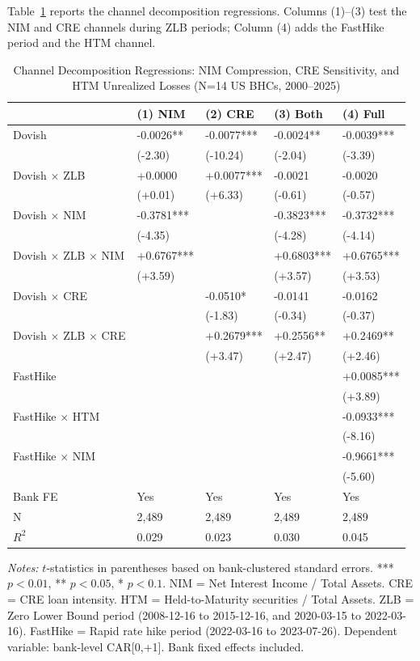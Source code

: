 \documentclass[12pt,a4paper]{article}
\begin{document}
Table~\ref{tab:channel} reports the channel decomposition regressions. Columns (1)--(3) test the NIM and CRE channels during ZLB periods; Column (4) adds the FastHike period and the HTM channel.

\begin{table}[H]
\centering
\caption{Channel Decomposition Regressions: NIM Compression, CRE Sensitivity, and HTM Unrealized Losses (N=14 US BHCs, 2000--2025)}
\label{tab:channel}
\small
\begin{tabular}{lllll}
\toprule
 & (1) NIM & (2) CRE & (3) Both & (4) Full \\
\midrule
Dovish & -0.0026** & -0.0077*** & -0.0024** & -0.0039*** \\
 & (-2.30) & (-10.24) & (-2.04) & (-3.39) \\
Dovish $\times$  ZLB & +0.0000 & +0.0077*** & -0.0021 & -0.0020 \\
 & (+0.01) & (+6.33) & (-0.61) & (-0.57) \\
Dovish $\times$  NIM & -0.3781*** &  & -0.3823*** & -0.3732*** \\
 & (-4.35) &  & (-4.28) & (-4.14) \\
Dovish $\times$  ZLB $\times$  NIM & +0.6767*** &  & +0.6803*** & +0.6765*** \\
 & (+3.59) &  & (+3.57) & (+3.53) \\
Dovish $\times$  CRE &  & -0.0510* & -0.0141 & -0.0162 \\
 &  & (-1.83) & (-0.34) & (-0.37) \\
Dovish $\times$  ZLB $\times$  CRE &  & +0.2679*** & +0.2556** & +0.2469** \\
 &  & (+3.47) & (+2.47) & (+2.46) \\
FastHike &  &  &  & +0.0085*** \\
 &  &  &  & (+3.89) \\
FastHike $\times$  HTM &  &  &  & -0.0933*** \\
 &  &  &  & (-8.16) \\
FastHike $\times$  NIM &  &  &  & -0.9661*** \\
 &  &  &  & (-5.60) \\
Bank FE & Yes & Yes & Yes & Yes \\
N & 2,489 & 2,489 & 2,489 & 2,489 \\
$R^2$ & 0.029 & 0.023 & 0.030 & 0.045 \\
\bottomrule
\end{tabular}
\end{table}
\noindent\textit{Notes:} $t$-statistics in parentheses based on bank-clustered standard errors. *** $p<0.01$, ** $p<0.05$, * $p<0.1$. NIM = Net Interest Income / Total Assets. CRE = CRE loan intensity. HTM = Held-to-Maturity securities / Total Assets. ZLB = Zero Lower Bound period (2008-12-16 to 2015-12-16, and 2020-03-15 to 2022-03-16). FastHike = Rapid rate hike period (2022-03-16 to 2023-07-26). Dependent variable: bank-level CAR[0,+1]. Bank fixed effects included.
\end{document}
